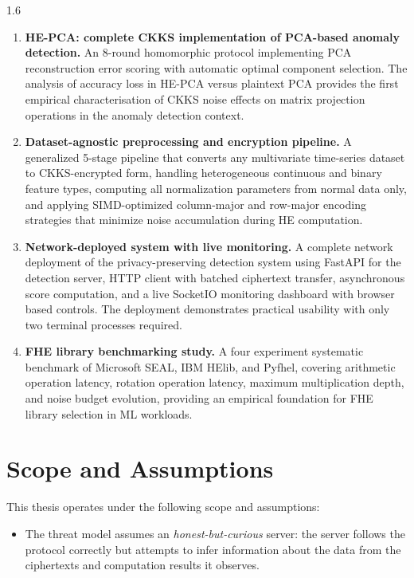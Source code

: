\begin{spacing}{1.6}
\begin{enumerate}
  \item \textbf{HE-PCA: complete CKKS implementation of PCA-based anomaly
  detection.} An 8-round homomorphic protocol implementing PCA reconstruction
  error scoring with automatic optimal component selection. The analysis of
  accuracy loss in HE-PCA versus plaintext PCA provides the first empirical
  characterisation of CKKS noise effects on matrix projection operations in the
  anomaly detection context.

  \item \textbf{Dataset-agnostic preprocessing and encryption pipeline.}
  A generalized 5-stage pipeline that converts any multivariate time-series
  dataset to CKKS-encrypted form, handling heterogeneous continuous and binary
  feature types, computing all normalization parameters from normal data only,
  and applying SIMD-optimized column-major and row-major encoding strategies
  that minimize noise accumulation during HE computation.

  \item \textbf{Network-deployed system with live monitoring.}
  A complete network deployment of the privacy-preserving detection system using
  FastAPI for the detection server, HTTP client with batched ciphertext transfer,
  asynchronous score computation, and a live SocketIO monitoring dashboard with
  browser based controls. The deployment demonstrates practical usability with
  only two terminal processes required.

  \item \textbf{FHE library benchmarking study.}
  A four experiment systematic benchmark of Microsoft SEAL, IBM HElib, and
  Pyfhel, covering arithmetic operation latency, rotation operation latency,
  maximum multiplication depth, and noise budget evolution, providing an
  empirical foundation for FHE library selection in ML workloads.
\end{enumerate}

\section{Scope and Assumptions}

This thesis operates under the following scope and assumptions:

\begin{itemize}
  \item The threat model assumes an \textit{honest-but-curious} server: the
  server follows the protocol correctly but attempts to infer information about
  the data from the ciphertexts and computation results it observes.


\end{itemize}
\end{spacing}
